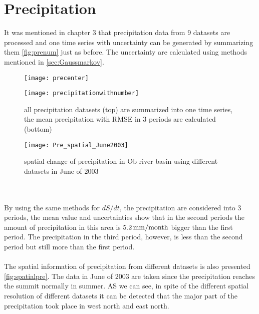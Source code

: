 \section{Precipitation}
It was mentioned in chapter 3 that precipitation data from 9 datasets are processed and one time series with uncertainty can be generated by summarizing them \autoref{fig:prenum} just as before. The uncertainty are calculated using methods mentioned in \autoref{sec:Gaussmarkov}.
\begin{figure}[htbp]\centering
	\begin{minipage}[t]{0.9\textwidth}
		\centering
		\texttt{[image: precenter]} %
	\end{minipage}
	\begin{minipage}[t]{0.9\textwidth}
		\centering
		\texttt{[image: precipitationwithnumber]} %
	\end{minipage}
	\caption{all precipitation datasets (top) are summarized into one time series, the mean precipitation with RMSE in 3 periods are calculated (bottom)}
	\label{fig:prenum}
\end{figure}
\begin{figure}[htbp]\centering
	\centering
	\texttt{[image: Pre\_spatial\_June2003]} %
	\caption{spatial change of precipitation in Ob river basin using different datasets in June of 2003} 
	\label{fig:spatialpre}
\end{figure}\\\\
By using the same methods for $dS/dt$, the precipitation are considered into 3 periods, the mean value and uncertainties show that in the second periods the amount of precipitation in this area is $5.2\,\mathrm{mm/month}$ bigger than the first period. The precipitation in the third period, however, is less than the second period but still more than the first period.\\\\
The spatial information of precipitation from different datasets is also presented \autoref{fig:spatialpre}. The data in June of 2003 are taken since the precipitation reaches the summit normally in summer. AS we can see, in spite of the different spatial resolution of different datasets it can be detected that the major part of the precipitation took place in west north and east north. 

